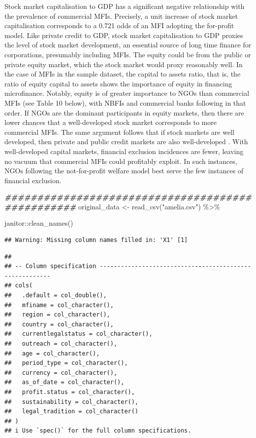 \documentclass[a4paper,nobind]{templates/ociamthesis}
\newenvironment{Shaded}{\begin{snugshade}}{\end{snugshade}}
\newcommand{\DocumentationTok}[1]{\textcolor[rgb]{0.56,0.35,0.01}{\textbf{\textit{#1}}}}
\newcommand{\FunctionTok}[1]{\textcolor[rgb]{0.00,0.00,0.00}{#1}}
\newcommand{\NormalTok}[1]{#1}
\newcommand{\OtherTok}[1]{\textcolor[rgb]{0.56,0.35,0.01}{#1}}
\newcommand{\SpecialCharTok}[1]{\textcolor[rgb]{0.00,0.00,0.00}{#1}}
\newcommand{\StringTok}[1]{\textcolor[rgb]{0.31,0.60,0.02}{#1}}
\renewenvironment{Shaded}
{
  \vspace{10pt}%
  \begin{snugshade}%
}{%
  \end{snugshade}%
  \vspace{8pt}%
}
\begin{document}
Stock market capitalisation to GDP has a significant negative relationship with the prevalence of commercial MFIs. Precisely, a unit increase of stock market capitalisation corresponds to a 0.721 odds of an MFI adopting the for-profit model. Like private credit to GDP, stock market capitalisation to GDP proxies the level of stock market development, an essential source of long time finance for corporations, presumably including MFIs. The equity could be from the public or private equity market, which the stock market would proxy reasonably well. In the case of MFIs in the sample dataset, the capital to assets ratio, that is, the ratio of equity capital to assets shows the importance of equity in financing microfinance. Notably, equity is of greater importance to NGOs than commercial MFIs (see Table 10 below), with NBFIs and commercial banks following in that order. If NGOs are the dominant participants in equity markets, then there are lower chances that a well-developed stock market corresponds to more commercial MFIs. The same argument follows that if stock markets are well developed, then private and public credit markets are also well-developed \autocite{schnyder2018twenty}. With well-developed capital markets, financial exclusion incidences are fewer, leaving no vacuum that commercial MFIs could profitably exploit. In such instances, NGOs following the not-for-profit welfare model best serve the few instances of financial exclusion.

\begin{Shaded}
\begin{Highlighting}[]
\DocumentationTok{\#\#\#\#\#\#\#\#\#\#\#\#\#\#\#\#\#\#\#\#\#\#\#\#\#\#\#\#\#\#\#\#\#\#\#\#\#\#\#\#\#\#\#\#\#\#\#\#\#}
\NormalTok{original\_data }\OtherTok{\textless{}{-}} \FunctionTok{read\_csv}\NormalTok{(}\StringTok{"amelia.csv"}\NormalTok{) }\SpecialCharTok{\%\textgreater{}\%} 
  
\NormalTok{  janitor}\SpecialCharTok{::}\FunctionTok{clean\_names}\NormalTok{() }
\end{Highlighting}
\end{Shaded}

\begin{verbatim}
## Warning: Missing column names filled in: 'X1' [1]
\end{verbatim}

\begin{verbatim}
## 
## -- Column specification --------------------------------------------------------
## cols(
##   .default = col_double(),
##   mfiname = col_character(),
##   region = col_character(),
##   country = col_character(),
##   currentlegalstatus = col_character(),
##   outreach = col_character(),
##   age = col_character(),
##   period_type = col_character(),
##   currency = col_character(),
##   as_of_date = col_character(),
##   profit.status = col_character(),
##   sustainability = col_character(),
##   legal_tradition = col_character()
## )
## i Use `spec()` for the full column specifications.
\end{verbatim}
\end{document}
